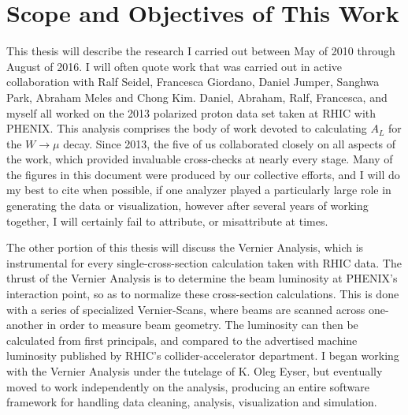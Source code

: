 \section{Scope and Objectives of This Work}
This thesis will describe the research I carried out between May of 2010 through
August of 2016. I will often quote work that was carried out in active
collaboration with Ralf Seidel, Francesca Giordano, Daniel Jumper, Sanghwa Park,
Abraham Meles and Chong Kim. Daniel, Abraham, Ralf, Francesca, and myself all
worked on the 2013 polarized proton data set taken at RHIC with PHENIX. This
analysis comprises the body of work devoted to calculating $A_L$ for the
$W\rightarrow\mu$ decay. Since 2013, the five of us collaborated closely on all
aspects of the work, which provided invaluable cross-checks at nearly every
stage. Many of the figures in this document were produced by our collective
efforts, and I will do my best to cite when possible, if one analyzer played a
particularly large role in generating the data or visualization, however after
several years of working together, I will certainly fail to attribute, or
misattribute at times.

The other portion of this thesis will discuss the Vernier Analysis, which is
instrumental for every single-cross-section calculation taken with RHIC data.
The thrust of the Vernier Analysis is to determine the beam luminosity at
PHENIX's interaction point, so as to normalize these cross-section calculations.
This is done with a series of specialized Vernier-Scans, where beams are scanned
across one-another in order to measure beam geometry. The luminosity can then be
calculated from first principals, and compared to the advertised machine
luminosity published by RHIC's collider-accelerator department. I began working
with the Vernier Analysis under the tutelage of K. Oleg Eyser, but eventually
moved to work independently on the analysis, producing an entire software
framework for handling data cleaning, analysis, visualization and simulation.
